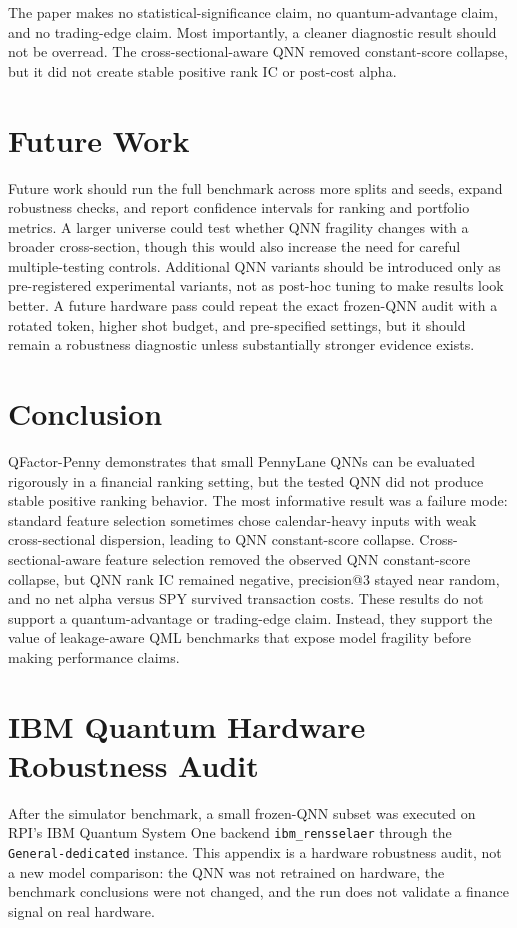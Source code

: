 \documentclass[11pt]{article}
\makeatletter
\newcommand{\project}{QFactor-Penny}
\newcommand{\keyresult}{Cross-sectional-aware feature selection removed the observed QNN constant-score collapse, but QNN rank IC remained negative, precision@3 stayed near random, and no net alpha versus SPY survived transaction costs.}
\makeatother
\begin{document}
The paper makes no statistical-significance claim, no quantum-advantage claim, and no trading-edge claim. Most importantly, a cleaner diagnostic result should not be overread. The cross-sectional-aware QNN removed constant-score collapse, but it did not create stable positive rank IC or post-cost alpha.

\section{Future Work}

Future work should run the full benchmark across more splits and seeds, expand robustness checks, and report confidence intervals for ranking and portfolio metrics. A larger universe could test whether QNN fragility changes with a broader cross-section, though this would also increase the need for careful multiple-testing controls. Additional QNN variants should be introduced only as pre-registered experimental variants, not as post-hoc tuning to make results look better. A future hardware pass could repeat the exact frozen-QNN audit with a rotated token, higher shot budget, and pre-specified settings, but it should remain a robustness diagnostic unless substantially stronger evidence exists.

\section{Conclusion}

\project{} demonstrates that small PennyLane QNNs can be evaluated rigorously in a financial ranking setting, but the tested QNN did not produce stable positive ranking behavior. The most informative result was a failure mode: standard feature selection sometimes chose calendar-heavy inputs with weak cross-sectional dispersion, leading to QNN constant-score collapse. \keyresult{} These results do not support a quantum-advantage or trading-edge claim. Instead, they support the value of leakage-aware QML benchmarks that expose model fragility before making performance claims.

\appendix
\section{IBM Quantum Hardware Robustness Audit}

After the simulator benchmark, a small frozen-QNN subset was executed on RPI's IBM Quantum System One backend \texttt{ibm\_rensselaer} through the \texttt{General-dedicated} instance. This appendix is a hardware robustness audit, not a new model comparison: the QNN was not retrained on hardware, the benchmark conclusions were not changed, and the run does not validate a finance signal on real hardware.
\end{document}
